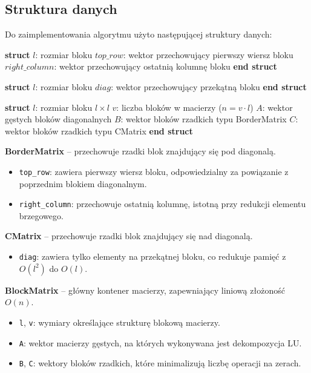 \documentclass{article}
\begin{document}
\newpage
\subsection*{Struktura danych}
Do zaimplementowania algorytmu użyto następującej struktury danych:
\begin{algorithm}
\caption{Definicja struktur danych macierzy blokowej}
\begin{algorithmic}[1]

\State \textbf{struct} 
    \State \quad $l$: rozmiar bloku
    \State \quad $top\_row$: wektor przechowujący pierwszy wiersz bloku
    \State \quad $right\_column$: wektor przechowujący ostatnią kolumnę bloku
\State \textbf{end struct}

\State

\State \textbf{struct} 
    \State \quad $l$: rozmiar bloku
    \State \quad $diag$: wektor przechowujący przekątną bloku
\State \textbf{end struct}

\State

\State \textbf{struct} 
    \State \quad $l$: rozmiar bloku $l \times l$
    \State \quad $v$: liczba bloków w macierzy ($n = v \cdot l$)
    \State \quad $A$: wektor gęstych bloków diagonalnych
    \State \quad $B$: wektor bloków rzadkich typu BorderMatrix
    \State \quad $C$: wektor bloków rzadkich typu CMatrix
\State \textbf{end struct}

\end{algorithmic}
\end{algorithm}

\textbf{BorderMatrix} -- przechowuje rzadki blok znajdujący się pod diagonalą.
\begin{itemize}
    \item \texttt{top\_row}: zawiera pierwszy wiersz bloku, odpowiedzialny za powiązanie z poprzednim blokiem diagonalnym.
    \item \texttt{right\_column}: przechowuje ostatnią kolumnę, istotną przy redukcji elementu brzegowego.
\end{itemize}

\textbf{CMatrix} -- przechowuje rzadki blok znajdujący się nad diagonalą.
\begin{itemize}
    \item \texttt{diag}: zawiera tylko elementy na przekątnej bloku, co redukuje pamięć z $O(l^2)$ do $O(l)$.
\end{itemize}

\textbf{BlockMatrix} -- główny kontener macierzy, zapewniający liniową złożoność $O(n)$.
\begin{itemize}
    \item \texttt{l}, \texttt{v}: wymiary określające strukturę blokową macierzy.
    \item \texttt{A}: wektor macierzy gęstych, na których wykonywana jest dekompozycja LU.
    \item \texttt{B}, \texttt{C}: wektory bloków rzadkich, które minimalizują liczbę operacji na zerach.
\end{itemize}
\end{document}

